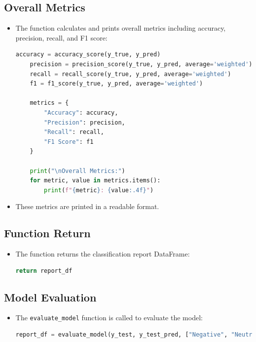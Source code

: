 \documentclass{solutionclass} %
\begin{document}
\begin{solution}
\subsection*{Overall Metrics}

\begin{itemize}
    \item The function calculates and prints overall metrics including accuracy, precision, recall, and F1 score:
    \begin{lstlisting}[language=Python]
    accuracy = accuracy_score(y_true, y_pred)
    precision = precision_score(y_true, y_pred, average='weighted')
    recall = recall_score(y_true, y_pred, average='weighted')
    f1 = f1_score(y_true, y_pred, average='weighted')

    metrics = {
        "Accuracy": accuracy,
        "Precision": precision,
        "Recall": recall,
        "F1 Score": f1
    }

    print("\nOverall Metrics:")
    for metric, value in metrics.items():
        print(f"{metric}: {value:.4f}")
    \end{lstlisting}
    \item These metrics are printed in a readable format.
\end{itemize}

\subsection*{Function Return}

\begin{itemize}
    \item The function returns the classification report DataFrame:
    \begin{lstlisting}[language=Python]
    return report_df
    \end{lstlisting}
\end{itemize}

\subsection*{Model Evaluation}

\begin{itemize}
    \item The \texttt{evaluate\_model} function is called to evaluate the model:
    \begin{lstlisting}[language=Python]
    report_df = evaluate_model(y_test, y_test_pred, ["Negative", "Neutral", "Positive"])
    \end{lstlisting}
\end{itemize}
\end{solution}
\end{document}
